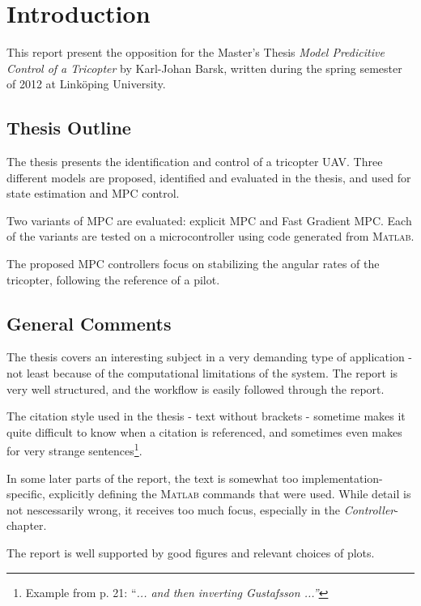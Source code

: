 \section{Introduction}
\label{sec:introduction}
	This report present the opposition for the Master's Thesis 
	\textit{Model Predicitive Control of a Tricopter} by Karl-Johan Barsk, written
	during the spring semester of 2012 at Linköping University.

\subsection{Thesis Outline}
	The thesis presents the identification and control of a tricopter UAV.
	Three different models are proposed, identified and evaluated in the 
	thesis, and used for state estimation and MPC control. 
	
	Two variants of MPC are evaluated: explicit MPC and Fast Gradient MPC.
	Each of the variants are tested on a microcontroller using code generated
	from \textsc{Matlab}.
	
	The proposed MPC controllers focus on stabilizing the angular rates of
	the tricopter, following the reference of a pilot.

\subsection{General Comments}
	The thesis covers an interesting subject in a very demanding type of 
	application - not least because of the computational limitations of the system.
	The report is very well structured, and the workflow is easily followed 
	through the report.

	The citation style used in the thesis - text without brackets - sometime makes
	it quite difficult to know when a citation is referenced, and sometimes even
	makes for very strange sentences\footnote{Example from p. 21: ``\textit{... and then inverting Gustafsson ...''}}.

	In some later parts of the report, the text is somewhat too implementation-specific,
	explicitly defining the \textsc{Matlab} commands that were used. 
	While detail is not nescessarily wrong, it receives too much focus, 
	especially in the \textit{Controller}-chapter.

	The report is well supported by good figures and relevant choices of
	plots.
